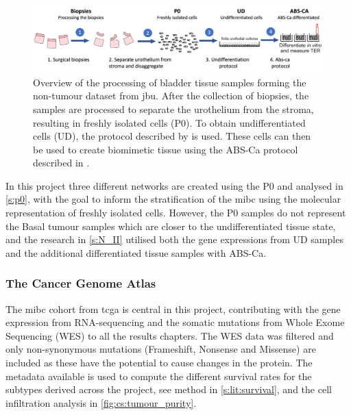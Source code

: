 \begin{figure}[!b]
    \centering
    \includegraphics[width=1.0\textwidth, keepaspectratio]{Sections/Lit_review/Resources/differentiation.png}
    \caption[How the biopsies from the non-tumour dataset are processed]{Overview of the processing of bladder tissue samples forming the non-tumour dataset from \acrfull{jbu}. After the collection of biopsies, the samples are processed to separate the urothelium from the stroma, resulting in freshly isolated cells (P0). To obtain undifferentiated cells (UD), the protocol described by \citet{Cross2005-fe} is used. These cells can then be used to create biomimetic tissue using the ABS-Ca protocol described in \citet{Cross2005-fe}.}
    \label{fig:lit:diff_samples}
\end{figure}


In this project three different networks are created using the P0 and analysed in \cref{s:p0}, with the goal to inform the stratification of the \acrshort{mibc} using the molecular representation of freshly isolated cells. However, the P0 samples do not represent the Basal tumour samples which are closer to the  undifferentiated tissue state, and the research in \cref{s:N_II} utilised both the gene expressions from UD samples and the additional differentiated tissue samples with ABS-Ca.

\subsubsection*{The Cancer Genome Atlas} \label{s:lit:tcga_data}

The \acrshort{mibc} cohort from \acrfull{tcga} is central in this project, contributing with the gene expression from RNA-sequencing and the somatic mutations from Whole Exome Sequencing (WES) to all the results chapters.  The WES data was filtered and only non-synonymous mutations (Frameshift, Nonsense and Missense) are included as these have the potential to cause changes in the protein. The metadata available is used to compute the different survival rates for the subtypes derived across the project, see method in \cref{s:lit:survival}, and the cell infiltration analysis in \cref{fig:cs:tumour_purity}.
